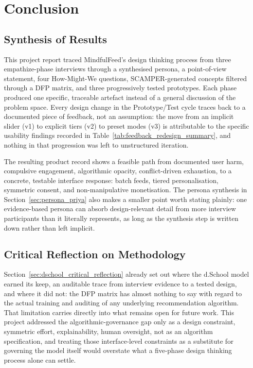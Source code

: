 \documentclass[11pt]{article}
\begin{document}
\section{Conclusion}

\subsection{Synthesis of Results}
This project report traced MindfulFeed's design thinking process from three empathize-phase interviews through a synthesised persona, a point-of-view statement, four How-Might-We questions, SCAMPER-generated concepts filtered through a DFP matrix, and three progressively tested prototypes. Each phase produced one specific, traceable artefact instead of a general discussion of the problem space. Every design change in the Prototype/Test cycle traces back to a documented piece of feedback, not an assumption: the move from an implicit slider (v1) to explicit tiers (v2) to preset modes (v3) is attributable to the specific usability findings recorded in Table~\ref{tab:feedback_redesign_summary}, and nothing in that progression was left to unstructured iteration.

The resulting product record shows a feasible path from documented user harm, compulsive engagement, algorithmic opacity, conflict-driven exhaustion, to a concrete, testable interface response: batch feeds, tiered personalisation, symmetric consent, and non-manipulative monetisation. The persona synthesis in Section~\ref{sec:persona_priya} also makes a smaller point worth stating plainly: one evidence-based persona can absorb design-relevant detail from more interview participants than it literally represents, as long as the synthesis step is written down rather than left implicit.

\subsection{Critical Reflection on Methodology}
Section~\ref{sec:dschool_critical_reflection} already set out where the d.School model earned its keep, an auditable trace from interview evidence to a tested design, and where it did not: the DFP matrix has almost nothing to say with regard to the actual training and auditing of any underlying recommendation algorithm. That limitation carries directly into what remains open for future work. This project addressed the algorithmic-governance gap only as a design constraint, symmetric effort, explainability, human oversight, not as an algorithm specification, and treating those interface-level constraints as a substitute for governing the model itself would overstate what a five-phase design thinking process alone can settle.
\end{document}
